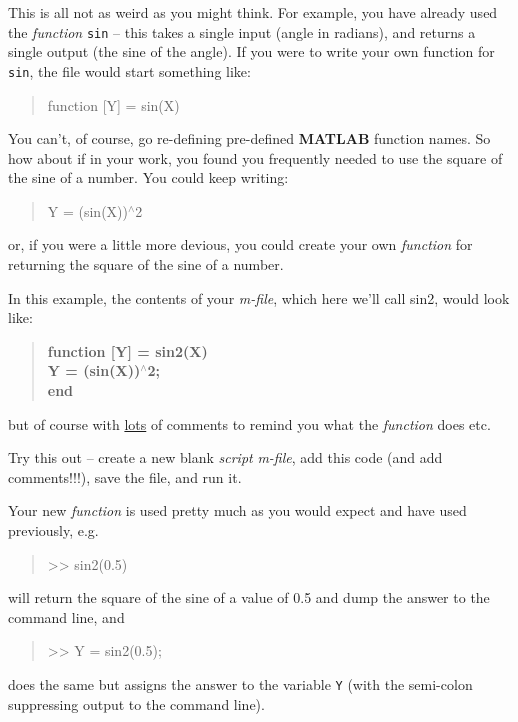 \documentclass{tufte-book} %
\newenvironment{docspec}{\begin{quotation}\ttfamily\parskip0pt\parindent0pt\ignorespaces}{\end{quotation}}
\begin{document}
\vspace{1mm}
This is all not as weird as you might think. For example, you have already used the \textit{function} \texttt{sin} -- this takes a single input (angle in radians), and returns a single output (the sine of the angle). If you were to write your own function for \texttt{sin}, the file would start something like:
\begin{docspec}
function [Y] = sin(X)
\end{docspec}
You can't, of course, go re-defining pre-defined \textbf{MATLAB} function names. So how about if in your work, you found you frequently needed to use the square of the sine of a number. You could keep writing:
\begin{docspec}
Y = (sin(X))\(^{\wedge}\)2
\end{docspec}
\noindent or, if you were a little more devious, you could create your own \textit{function} for returning the square of the sine of a number. 

In this example, the contents of your \textit{m-file}, which here we'll call \textsf{sin2}, would look like:
\begin{docspec}
\textbf{function [Y] = sin2(X)
\\Y = (sin(X))\(^{\wedge}\)2; 
\\end}
\end{docspec}
\noindent but of course with \uline{lots} of comments to remind you what the \textit{function} does etc. 

Try this out -- create a new blank \textit{script} \textit{m-file}, add this code (and add comments!!!), save the file, and run it.

Your new \textit{function} is used pretty much as you would expect and have used previously, e.g.
\begin{docspec}
>> sin2(0.5)
\end{docspec}
\noindent will return the square of the sine of a value of 0.5 and dump the answer to the command line, and 
\begin{docspec}
>> Y = sin2(0.5);
\end{docspec}
\noindent does the same but assigns the answer to the variable \texttt{Y} (with the semi-colon suppressing output to the command line).
\end{document}
